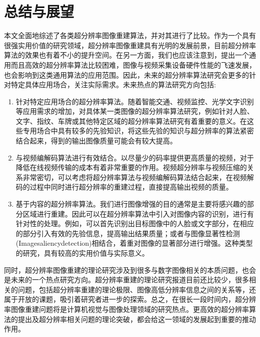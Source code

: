 \documentclass[]{article}
\begin{document}
    \section{总结与展望}
    本文全面地综述了各类超分辨率图像重建算法，并对其进行了比较。作为一个具有很强实用价值的研究领域，超分辨率图像重建具有光明的发展前景，目前超分辨率算法的效果也有着不小的提升空间。在另一方面，我们也应该注意到，提出一个通用而且高效的超分辨率算法比较困难，图像与视频采集设备硬件性能的飞速发展，也会影响到这类通用算法的应用范围。因此，未来的超分辨率算法研究会更多的针对特定具体应用场合，关注实际需求。未来热点的算法研究方向包括:
    \begin{enumerate}
        \item 针对特定应用场合的超分辨率算法。随着智能交通、视频监控、光学文字识别等应用需求的增加，对具体某一类图像的超分辨率算法研究，例如针对人脸、文字、指纹、车牌或其他特定区域的超分辨率算法研究有着重要的意义。在这些专用场合中具有较多的先验知识，将这些先验的知识与超分辨率的算法紧密结合起来，得到的输出图像质量可能会有较大提高。
        \item 与视频编解码算法进行有效结合。以尽量少的码率提供更高质量的视频，对于降低在线视频传输的成本有着非常重要的作用。视频超分辨率与视频压缩的关系非常密切，可以考虑将超分辨率算法与视频编解码算法结合起来，在视频解码的过程中同时进行超分辨率的重建过程，直接提高输出视频的质量。
        \item 基于内容的超分辨率算法。我们进行图像增强的目的通常是主要将感兴趣的部分区域进行重建。因此可以在超分辨率算法中引入对图像内容的识别，进行有针对性的处理。例如，可以首先识别出目标图像中的人脸或文字部分，在相应的部分引入有效的先验信息，提高输出结果质量；或者与图像显著性检测(Imagesaliencydetection)相结合，着重对图像的显著部分进行增强。这种类型的研究，具有较高的实用价值与实际意义。
    \end{enumerate}

    同时，超分辨率图像重建的理论研究涉及到很多与数字图像相关的本质问题，也会是未来的一个热点研究方向。超分辨率重建的理论研究报道目前还比较少，很多相关的问题，包括超分辨率重建的理论极限、图像高低分辨率信息之间的关系等，还属于开放的课题，吸引着研究者进一步的探索。总之，在很长一段时间内，超分辨率图像重建问题将是计算机视觉与图像处理领域的研究热点。更高效的超分辨率算法的提出及超分辨率相关问题的理论突破，都会给这一领域的发展起到重要的推动作用。
\end{document}

